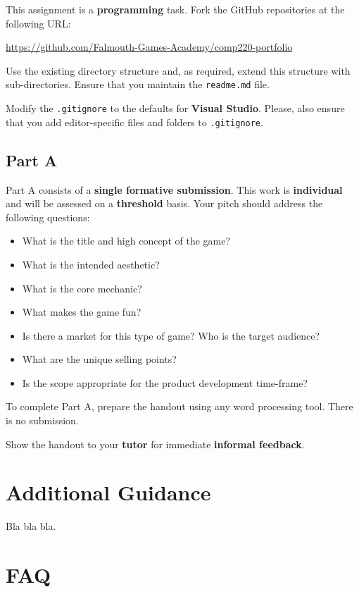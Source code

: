 \documentclass{../fal_assignment}
\begin{document}
This assignment is a \textbf{programming} task. Fork the GitHub repositories at the following URL:

\indent \url{https://github.com/Falmouth-Games-Academy/comp220-portfolio}

Use the existing directory structure and, as required, extend this structure with sub-directories.
Ensure that you maintain the \texttt{readme.md} file.

Modify the \texttt{.gitignore} to the defaults for \textbf{Visual Studio}.
Please, also ensure that you add editor-specific files and folders to \texttt{.gitignore}. 

\subsection*{Part A}

Part A consists of a \textbf{single formative submission}.
This work is \textbf{individual} and will be assessed on a \textbf{threshold} basis.
Your pitch should address the following questions:

\begin{itemize}
	\item What is the title and high concept of the game?
	\item What is the intended aesthetic?
	\item What is the core mechanic? 
	\item What makes the game fun?
	\item Is there a market for this type of game? Who is the target audience?
	\item What are the unique selling points?
	\item Is the scope appropriate for the product development time-frame?
\end{itemize}

To complete Part A, prepare the handout using any word processing tool. There is no submission.

Show the handout to your \textbf{tutor} for immediate \textbf{informal feedback}.

\section*{Additional Guidance}

Bla bla bla.

\section*{FAQ}
\end{document}
